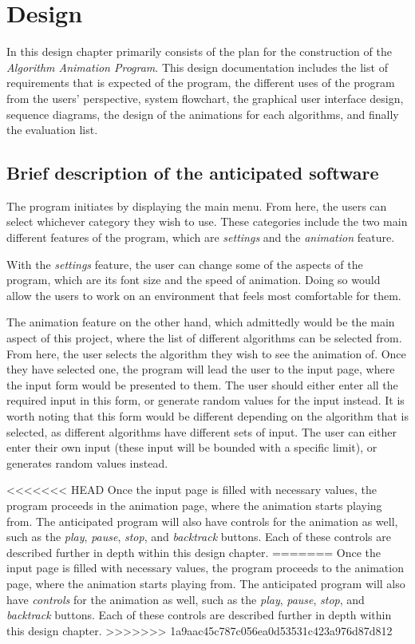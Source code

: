 \chapter{Design}

In this design chapter primarily consists of the plan for the construction of the \textit{Algorithm Animation Program}. This design documentation includes the list of requirements that is expected of the program, the different uses of the program from the users' perspective, system flowchart, the graphical user interface design, sequence diagrams, the design of the animations for each algorithms, and finally the evaluation list.

\section{Brief description of the anticipated software}
The program initiates by displaying the main menu. From here, the users can select whichever category they wish to use. These categories include the two main different features of the program, which are \textit{settings} and the \textit{animation} feature.

With the \textit{settings} feature, the user can change some of the aspects of the program, which are its font size and the speed of animation. Doing so would allow the users to work on an environment that feels most comfortable for them.

The animation feature on the other hand, which admittedly would be the main aspect of this project, where the list of different algorithms can be selected from. From here, the user selects the algorithm they wish to see the animation of. Once they have selected one, the program will lead the user to the input page, where the input form would be presented to them. The user should either enter all the required input in this form, or generate random values for the input instead. It is worth noting that this form would be different depending on the algorithm that is selected, as different algorithms have different sets of input. The user can either enter their own input (these input will be bounded with a specific limit), or generates random values instead. 

<<<<<<< HEAD
Once the input page is filled with necessary values, the program proceeds in the animation page, where the animation starts playing from. The anticipated program will also have controls for the animation as well, such as the \textit{play}, \textit{pause}, \textit{stop}, and \textit{backtrack} buttons. Each of these controls are described further in depth within this design chapter.
=======
Once the input page is filled with necessary values, the program proceeds to the animation page, where the animation starts playing from. The anticipated program will also have \textit{controls} for the animation as well, such as the \textit{play}, \textit{pause}, \textit{stop}, and \textit{backtrack} buttons. Each of these controls are described further in depth within this design chapter.
>>>>>>> 1a9aac45c787c056ea0d53531c423a976d87d812

